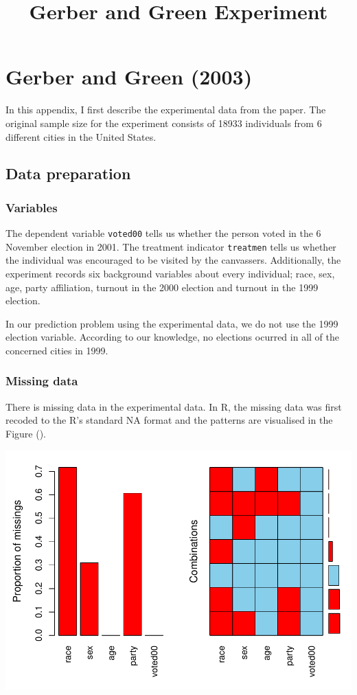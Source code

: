 \documentclass[]{article}
\title{Gerber and Green Experiment}
\date{}
\begin{document}
\maketitle

\section{Gerber and Green (2003)}\label{gerber-and-green-2003}

In this appendix, I first describe the experimental data from the paper.
The original sample size for the experiment consists of 18933
individuals from 6 different cities in the United States.

\subsection{Data preparation}\label{data-preparation}

\subsubsection{Variables}\label{variables}

The dependent variable \texttt{voted00} tells us whether the person
voted in the 6 November election in 2001. The treatment indicator
\texttt{treatmen} tells us whether the individual was encouraged to be
visited by the canvassers. Additionally, the experiment records six
background variables about every individual; race, sex, age, party
affiliation, turnout in the 2000 election and turnout in the 1999
election.

In our prediction problem using the experimental data, we do not use the
1999 election variable. According to our knowledge, no elections ocurred
in all of the concerned cities in 1999.

\subsubsection{Missing data}\label{missing-data}

There is missing data in the experimental data. In R, the missing data
was first recoded to the R's standard NA format and the patterns are
visualised in the Figure ().

\includegraphics{GerberGreen_Appendix_files/figure-latex/Aggregate plot for missingness-1.pdf}
\end{document}
